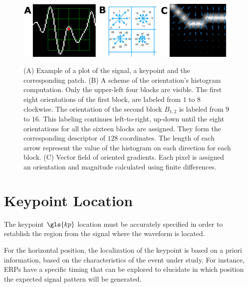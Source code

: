 \begin{figure}[h!]
\centering
\includegraphics[width=16cm]{images/gradients.png}\label{samplegradients}
\caption[Histogram of Gradient Orientations for ERP]{ (A) Example of a plot of the signal, a keypoint and the corresponding patch. (B) A scheme of the orientation's histogram computation.  Only the upper-left four blocks are visible.  The first eight orientations of the first block, are labeled from $1$ to $8$ clockwise. The orientation of the second block $ B_{1,2} $ is labeled from $9$ to $16$.  This labeling continues left-to-right, up-down until the eight orientations for all the sixteen blocks are assigned. They form the corresponding descriptor of $128$ coordinates.  The length of each arrow represent the value of the histogram on each direction for each block. (C) Vector field of oriented gradients.  Each pixel is assigned an orientation and magnitude calculated  using finite differences. }
\label{fig:sampledescriptor}
\end{figure}



\section{Keypoint Location}
\label{keypointlocation}

%


The keypoint $\gls{kp}$ location must be accurately specified in order to establish the region from the signal where the waveform is located.

For the horizontal position, the localization of the keypoint is based on a priori information, based on the characteristics of the event under study.  For instance, ERPs have a specific timing that can be explored to elucidate in which position the expected signal pattern will be generated.

